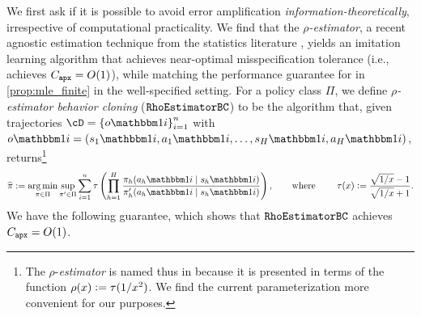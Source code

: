

We first ask if it is possible to avoid error amplification \emph{information-theoretically}, irrespective of computational practicality. We find that the \emph{$\rho$-estimator}, a recent agnostic estimation technique from the statistics literature \citep{baraud2018rho}, yields an imitation learning algorithm that achieves near-optimal misspecification tolerance (i.e., achieves $C_{\texttt{apx}}=O(1)$), while matching the performance guarantee for \loglossbc in \cref{prop:mle_finite} in the well-specified setting.
For a policy class $\Pi$, we define \emph{$\rho$-estimator behavior cloning} ($\texttt{RhoEstimatorBC}$) to be the algorithm that, given trajectories $\cD=\crl*{o\ind{i}}_{i=1}^{n}$ with $o\ind{i} = (s_1\ind{i},a_1\ind{i},\dots,s_H\ind{i},a_H\ind{i})$, returns\footnote{The $\rho$-\emph{estimator} is named thus in \citet{baraud2018rho} because it is presented in terms of the function $\rho(x) \vcentcolon= \tau(1/x^2)$.  We find the current parameterization more convenient for our purposes.}  \loose
\begin{align}\label{eq:rhobc}
    \pihat := \argmin_{\pi \in \Pi} \sup_{\pi' \in \Pi} 
\sum_{i=1}^n \tau\left(
\prod_{h=1}^{H}\frac{\pihi}{\piphi}\right), \qquad \text{where } \qquad \tau(x) \ldef \frac{\sqrt{1/x} - 1}{\sqrt{1/x} + 1}.
\end{align}
We have the following guarantee, which shows that $\texttt{RhoEstimatorBC}$ achieves $C_{\texttt{apx}} = O(1)$. %

